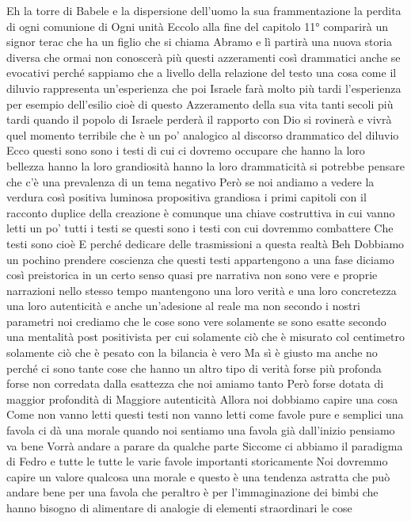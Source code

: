 Eh la torre di Babele e la dispersione dell'uomo la sua frammentazione la perdita di ogni comunione di Ogni unità Eccolo alla fine del capitolo 11° comparirà un signor terac che ha un figlio che si chiama Abramo e lì partirà una nuova storia diversa che ormai non conoscerà più questi azzeramenti così drammatici anche se evocativi perché sappiamo che a livello della relazione del testo una cosa come il diluvio rappresenta un'esperienza che poi Israele farà molto più tardi l'esperienza per esempio dell'esilio cioè di questo Azzeramento della sua vita tanti secoli più tardi quando il popolo di Israele perderà il rapporto con Dio si rovinerà e vivrà quel momento terribile che è un po' analogico al discorso drammatico del diluvio Ecco questi sono
sono i testi di cui ci dovremo occupare che hanno la loro bellezza hanno la loro grandiosità hanno la loro drammaticità si potrebbe pensare che c'è una prevalenza di un tema negativo Però se noi andiamo a vedere la verdura così positiva luminosa propositiva grandiosa i primi capitoli con il racconto duplice della creazione è comunque una chiave costruttiva in cui vanno letti un po' tutti i testi
se questi sono i testi con cui dovremmo combattere Che testi sono cioè E perché dedicare delle trasmissioni a questa realtà Beh Dobbiamo un pochino prendere coscienza che questi testi appartengono a una fase diciamo così preistorica in un certo senso quasi pre narrativa non sono vere e proprie narrazioni
nello stesso tempo mantengono una loro verità e una loro concretezza una loro autenticità e anche un'adesione al reale ma non secondo i nostri parametri noi crediamo che le cose sono vere solamente se sono esatte secondo una mentalità post positivista per cui solamente ciò che è misurato col centimetro solamente ciò che è pesato con la bilancia è vero Ma sì è giusto ma anche no perché ci sono tante cose che hanno un altro tipo di verità forse più profonda forse non corredata dalla esattezza che noi amiamo tanto Però forse dotata di maggior profondità di Maggiore autenticità Allora noi dobbiamo capire una cosa Come non vanno letti questi testi non vanno letti come favole pure e semplici
una favola ci dà una morale quando noi sentiamo una favola già dall'inizio pensiamo va bene Vorrà andare a parare da qualche parte Siccome ci abbiamo il paradigma di Fedro e tutte le tutte le varie favole importanti storicamente Noi dovremmo capire un valore qualcosa una morale
 e questo è una tendenza astratta che può andare bene per una favola che peraltro è per l'immaginazione dei bimbi che hanno bisogno di alimentare di analogie di elementi straordinari le cose
